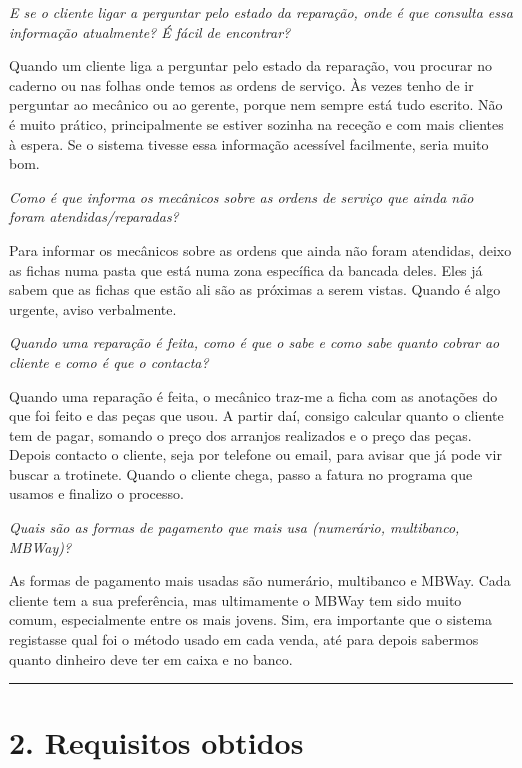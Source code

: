 \documentclass[11pt,a4paper]{article}
\newcommand{\pergunta}[1]{\item[P:] \textit{#1}}
\newcommand{\resposta}[1]{\item[R:] #1}
\begin{document}
\begin{transcription}
		\pergunta{E se o cliente ligar a perguntar pelo estado da reparação, onde é que consulta essa informação atualmente? É fácil de encontrar?}
		\resposta{Quando um cliente liga a perguntar pelo estado da reparação, vou procurar no caderno ou nas folhas onde temos as ordens de serviço. Às vezes tenho de ir perguntar ao mecânico ou ao gerente, porque nem sempre está tudo escrito. Não é muito prático, principalmente se estiver sozinha na receção e com mais clientes à espera. Se o sistema tivesse essa informação acessível facilmente, seria muito bom.}
		
		\pergunta{Como é que informa os mecânicos sobre as ordens de serviço que ainda não foram atendidas/reparadas?}
		\resposta{Para informar os mecânicos sobre as ordens que ainda não foram atendidas, deixo as fichas numa pasta que está numa zona específica da bancada deles. Eles já sabem que as fichas que estão ali são as próximas a serem vistas. Quando é algo urgente, aviso verbalmente.}
		
		\pergunta{Quando uma reparação é feita, como é que o sabe e como sabe quanto cobrar ao cliente e como é que o contacta?}
		\resposta{Quando uma reparação é feita, o mecânico traz-me a ficha com as anotações do que foi feito e das peças que usou. A partir daí, consigo calcular quanto o cliente tem de pagar, somando o preço dos arranjos realizados e o preço das peças. Depois contacto o cliente, seja por telefone ou email, para avisar que já pode vir buscar a trotinete. Quando o cliente chega, passo a fatura no programa que usamos e finalizo o processo.
			
		\pergunta{Quais são as formas de pagamento que mais usa (numerário, multibanco, MBWay)?}
		\resposta{As formas de pagamento mais usadas são numerário, multibanco e MBWay. Cada cliente tem a sua preferência, mas ultimamente o MBWay tem sido muito comum, especialmente entre os mais jovens. Sim, era importante que o sistema registasse qual foi o método usado em cada venda, até para depois sabermos quanto dinheiro deve ter em caixa e no banco.}

}
	\end{transcription}

	\hrule %
	\vspace{0.2cm}
	
	\section*{2. Requisitos obtidos}
	
\end{document}
